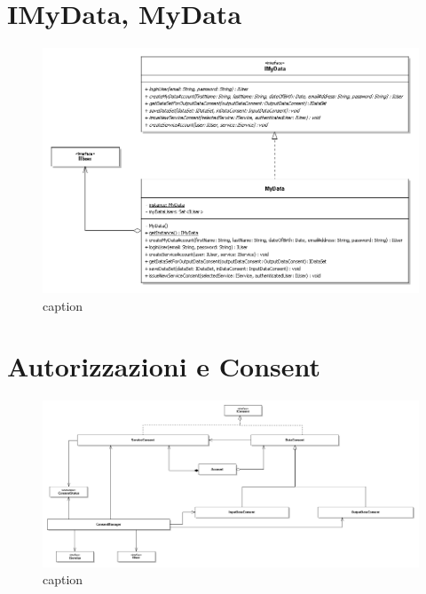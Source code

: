 \section{IMyData, MyData}
\begin{figure} [h]
	\includegraphics[width=\linewidth]{pictures/MyData.png}
	\caption{caption}
	\label{fig:Accounting-MyData}
\end{figure}

\section{Autorizzazioni e Consent}
\label{sec:P-AutorizzazioniEConsent}
\begin{figure} [h]
\includegraphics[width=\linewidth]{pictures/Auth-closed.png}
\caption{caption}
\label{fig:Auth-closed}
\end{figure}

